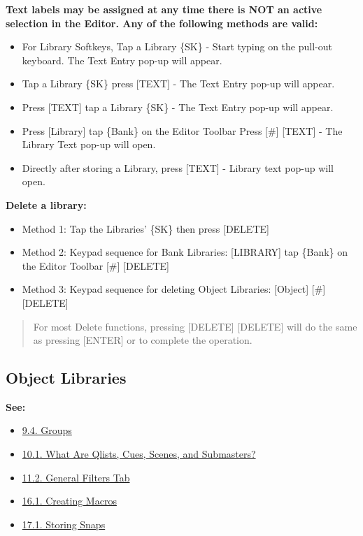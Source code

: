 \documentclass[
]{article}
\begin{document}
\textbf{Text labels may be assigned at any time there is NOT an active selection in the Editor. Any of the following methods are valid:}

\begin{itemize}
\item
  For Library Softkeys, Tap a Library \{SK\} - Start typing on the pull-out keyboard. The Text Entry pop-up will appear.
\item
  Tap a Library \{SK\} press {[}TEXT{]} - The Text Entry pop-up will appear.
\item
  Press {[}TEXT{]} tap a Library \{SK\} - The Text Entry pop-up will appear.
\item
  Press {[}Library{]} tap \{Bank\} on the Editor Toolbar Press {[}\#{]} {[}TEXT{]} - The Library Text pop-up will open.
\item
  Directly after storing a Library, press {[}TEXT{]} - Library text pop-up will open.
\end{itemize}

\textbf{Delete a library:}

\begin{itemize}
\item
  Method 1: Tap the Libraries' \{SK\} then press {[}DELETE{]}
\item
  Method 2: Keypad sequence for Bank Libraries: {[}LIBRARY{]} tap \{Bank\} on the Editor Toolbar {[}\#{]} {[}DELETE{]}
\item
  Method 3: Keypad sequence for deleting Object Libraries: {[}Object{]} {[}\#{]} {[}DELETE{]}
\end{itemize}

\begin{quote}
For most Delete functions, pressing {[}DELETE{]} {[}DELETE{]} will do the same as pressing {[}ENTER{]} or to complete the operation.
\end{quote}

\hypertarget{object-libraries}{%
\subsection{Object Libraries}\label{object-libraries}}

\textbf{See:}

\begin{itemize}
\item
  \href{https://vibemanual.compulite.com/programming-basics.html\#groups}{9.4. Groups}
\item
  \href{https://vibemanual.compulite.com/programming-cues-and-scenes.html\#what-are-qlists-cues-scenes-and-submasters}{10.1. What Are Qlists, Cues, Scenes, and Submasters?}
\item
  \href{https://vibemanual.compulite.com/filters.html\#general-filters-tab}{11.2. General Filters Tab}
\item
  \href{https://vibemanual.compulite.com/macros.html\#creating-macros}{16.1. Creating Macros}
\item
  \href{https://vibemanual.compulite.com/snaps-snapshots.html\#storing-snaps}{17.1. Storing Snaps}
\end{itemize}
\end{document}
